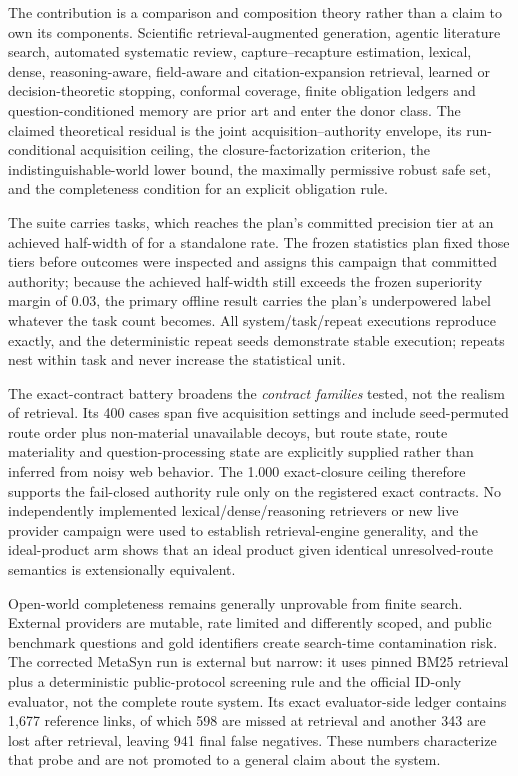 \documentclass[11pt]{article}
\theoremstyle{definition}
\begin{document}
The contribution is a comparison and composition theory rather than a claim to
own its components.  Scientific retrieval-augmented generation, agentic
literature search, automated systematic review, capture--recapture estimation,
lexical, dense, reasoning-aware, field-aware and citation-expansion retrieval,
learned or decision-theoretic stopping, conformal coverage, finite obligation
ledgers and question-conditioned memory are prior art and enter the donor class.
The claimed theoretical residual is the joint acquisition--authority envelope,
its run-conditional acquisition ceiling, the closure-factorization criterion,
the indistinguishable-world lower bound, the maximally permissive robust safe
set, and the completeness condition for an explicit obligation rule.

The suite carries \OfflineTaskCount{} tasks, which reaches the plan's committed precision tier at an achieved half-width of \OfflineAchievedHalfWidth{} for a standalone rate. The frozen statistics plan fixed those tiers before outcomes were inspected and assigns this campaign that committed authority; because the achieved half-width still exceeds the frozen superiority margin of $0.03$, the primary offline result carries the plan's underpowered label whatever the task count becomes. All \OfflineRunRecordCount{} system/task/repeat executions reproduce exactly, and the \OfflineRepeatCount{} deterministic repeat seeds demonstrate stable execution; repeats nest within task and never increase the statistical unit.

The exact-contract battery broadens the \emph{contract families} tested, not the realism of retrieval. Its 400 cases span five acquisition settings and include seed-permuted route order plus non-material unavailable decoys, but route state, route materiality and question-processing state are explicitly supplied rather than inferred from noisy web behavior. The 1.000 exact-closure ceiling therefore supports the fail-closed authority rule only on the registered exact contracts. No independently implemented lexical/dense/reasoning retrievers or new live provider campaign were used to establish retrieval-engine generality, and the ideal-product arm shows that an ideal product given identical unresolved-route semantics is extensionally equivalent.

Open-world completeness remains generally unprovable from finite search. External providers are mutable, rate limited and differently scoped, and public benchmark questions and gold identifiers create search-time contamination risk. The corrected MetaSyn run is external but narrow: it uses pinned BM25 retrieval plus a deterministic public-protocol screening rule and the official ID-only evaluator, not the complete route system. Its exact evaluator-side ledger contains 1,677 reference links, of which 598 are missed at retrieval and another 343 are lost after retrieval, leaving 941 final false negatives. These numbers characterize that probe and are not promoted to a general claim about the system.
\end{document}
